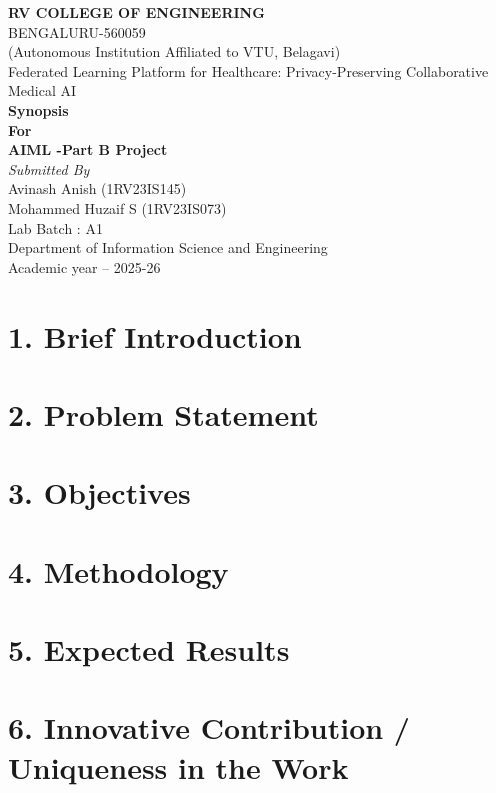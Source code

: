 \documentclass[12pt]{report}
\author{Department of Information Science and Engineering\\
        RV College of Engineering}
\date{\today}
\renewcommand{\normalsize}{\fontsize{12}{14.5}\selectfont}
\renewcommand{\maketitle}{%
    \begin{titlepage}
        \centering
        \vspace*{0.5cm}

        {\Large\bfseries RV COLLEGE OF ENGINEERING\textsuperscript{\textregistered}}\\[0.3cm]
        {\large BENGALURU-560059}\\[0.2cm]
        {\normalsize (Autonomous Institution Affiliated to VTU, Belagavi)}\\[3cm]

        {\large Federated Learning Platform for Healthcare: Privacy-Preserving Collaborative Medical AI}\\[0.3cm]
        {\normalsize \textbf{Synopsis}}\\[0.2cm]
        {\normalsize \textbf{For}}\\[0.2cm]
        {\normalsize \textbf{AIML -Part B Project}}\\[0.2cm]
        {\small \textit{Submitted By}}\\[0.5cm]

        {\normalsize Avinash Anish (1RV23IS145)\\
        Mohammed Huzaif S (1RV23IS073)}\\[4cm]

        {\normalsize Lab Batch : A1}\\[2cm]

        {\large Department of Information Science and Engineering}\\[0.2cm]
        {\normalsize Academic year -- 2025-26}

        \vfill
    \end{titlepage}%
}
\begin{document}
\maketitle

\section*{1. Brief Introduction}


\section*{2. Problem Statement}


\section*{3. Objectives}


\section*{4. Methodology}


\section*{5. Expected Results}


\section*{6. Innovative Contribution / Uniqueness in the Work}

\end{document}
